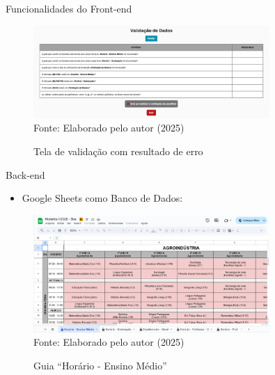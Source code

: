 \begin{frame}{Funcionalidades do Front-end}
    \begin{figure}
        \centering
        \vspace{-0.5cm}
        \caption{Tela de validação com resultado de erro}
        \vspace{-0.2cm}
        \includegraphics[width=0.8\textwidth]{figuras/front-24.png}
        \\ %
        \small Fonte: Elaborado pelo autor (2025)
    \end{figure}
\end{frame}

\begin{frame}{Back-end}
    \begin{itemize}
		\item Google Sheets como Banco de Dados: \vspace{0.5cm}
	\end{itemize}
    \begin{figure}
        \centering
        \vspace{-0.8cm}
        \caption{Guia ``Horário - Ensino Médio''}
        \vspace{-0.2cm}
        \includegraphics[width=0.8\textwidth]{figuras/plan-1.png}
        \\ %
        \small Fonte: Elaborado pelo autor (2025)
    \end{figure}
\end{frame}

